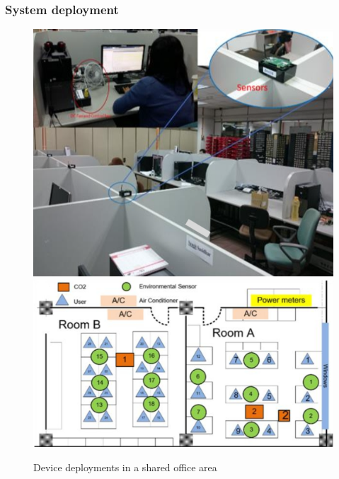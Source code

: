 \documentclass[aspectratio=169]{beamer}
\begin{document}
\begin{frame}
    \frametitle{System deployment}
    \begin{figure}
        \includegraphics[scale=0.25]{pic/office.png}
        \includegraphics[scale=0.2]{pic/system_deployment.png}
        \caption{Device deployments in a shared office area}
    \end{figure}
\end{frame}

\end{document}
